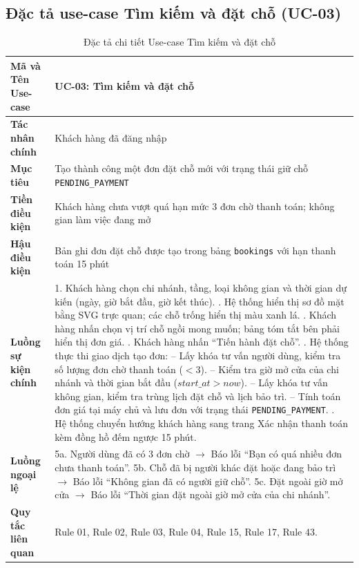 \subsection{Đặc tả use-case Tìm kiếm và đặt chỗ (UC-03)}
\begin{table}[H]
\centering
\small
\renewcommand{\arraystretch}{1.2}
\begin{tabular}{|p{3.6cm}|p{10.4cm}|}
\hline
\textbf{Mã và Tên Use-case} & \textbf{UC-03: Tìm kiếm và đặt chỗ} \\ \hline
\textbf{Tác nhân chính} & Khách hàng đã đăng nhập \\ \hline
\textbf{Mục tiêu} & Tạo thành công một đơn đặt chỗ mới với trạng thái giữ chỗ \texttt{PENDING\_PAYMENT} \\ \hline
\textbf{Tiền điều kiện} & Khách hàng chưa vượt quá hạn mức 3 đơn chờ thanh toán; không gian làm việc đang mở \\ \hline
\textbf{Hậu điều kiện} & Bản ghi đơn đặt chỗ được tạo trong bảng \texttt{bookings} với hạn thanh toán 15 phút \\ \hline
\textbf{Luồng sự kiện chính} & 
1. Khách hàng chọn chi nhánh, tầng, loại không gian và thời gian dự kiến (ngày, giờ bắt đầu, giờ kết thúc). \newline
2. Hệ thống hiển thị sơ đồ mặt bằng SVG trực quan; các chỗ trống hiển thị màu xanh lá. \newline
3. Khách hàng nhấn chọn vị trí chỗ ngồi mong muốn; bảng tóm tắt bên phải hiển thị đơn giá. \newline
4. Khách hàng nhấn ``Tiến hành đặt chỗ''. \newline
5. Hệ thống thực thi giao dịch tạo đơn: \newline
-- Lấy khóa tư vấn người dùng, kiểm tra số lượng đơn chờ thanh toán ($< 3$). \newline
-- Kiểm tra giờ mở cửa của chi nhánh và thời gian bắt đầu ($start\_at > now$). \newline
-- Lấy khóa tư vấn không gian, kiểm tra trùng lịch đặt chỗ và lịch bảo trì. \newline
-- Tính toán đơn giá tại máy chủ và lưu đơn với trạng thái \texttt{PENDING\_PAYMENT}. \newline
6. Hệ thống chuyển hướng khách hàng sang trang Xác nhận thanh toán kèm đồng hồ đếm ngược 15 phút. \\ \hline
\textbf{Luồng ngoại lệ} & 
5a. Người dùng đã có 3 đơn chờ $\rightarrow$ Báo lỗi ``Bạn có quá nhiều đơn chưa thanh toán''. \newline
5b. Chỗ đã bị người khác đặt hoặc đang bảo trì $\rightarrow$ Báo lỗi ``Không gian đã có người giữ chỗ''. \newline
5c. Đặt ngoài giờ mở cửa $\rightarrow$ Báo lỗi ``Thời gian đặt ngoài giờ mở cửa của chi nhánh''. \\ \hline
\textbf{Quy tắc liên quan} & Rule 01, Rule 02, Rule 03, Rule 04, Rule 15, Rule 17, Rule 43. \\ \hline
\end{tabular}
\caption{Đặc tả chi tiết Use-case Tìm kiếm và đặt chỗ}
\label{tab:uc_spec_03}
\end{table}

